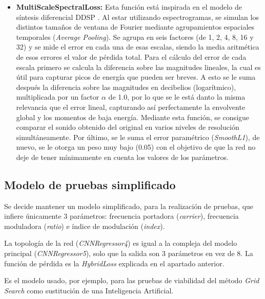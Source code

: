 \begin{itemize}
    \item \textbf{MultiScaleSpectralLoss: } Esta función está inspirada en el modelo de síntesis diferencial DDSP \citep{engel2020}. Al estar utilizando 
    espectrogramas, se simulan los distintos tamaños de ventana de Fourier mediante agrupamientos espaciales temporales (\textit{Average Pooling}).
    Se agrupa en seis factores (de 1, 2, 4, 8, 16 y 32) y se mide el error en cada una de esas escalas, siendo la media aritmética de esos errores
    el valor de pérdida total. Para el cálculo del error de cada escala primero se calcula la diferencia sobre las magnitudes
    lineales, la cual es útil para capturar picos de energía que pueden ser breves. A esto se le suma después la diferencia sobre las magnitudes en decibelios (logarítmico),
    multiplicada por un factor $\alpha$ de 1.0, por lo que se le está danto la misma relevancia que el error lineal, capturando así perfectamente
    la envolvente global y los momentos de baja energía. Mediante esta función, se consigue comparar el sonido obtenido del original
    en varios niveles de resolución simultáneamente. Por último, se le suma el error paramétrico (\textit{SmoothL1}), de nuevo, se le otorga un peso muy bajo (0.05) con el objetivo
    de que la red no deje de tener mínimamente en cuenta los valores de los parámetros.   
\end{itemize}


\subsection{Modelo de pruebas simplificado}
\label{sec:ModeloPruebasSimplificado}

Se decide mantener un modelo simplificado, para la realización de pruebas, que infiere únicamente 3 parámetros: frecuencia portadora (\textit{carrier}), frecuencia moduladora (\textit{ratio}) e índice de modulación (\textit{index}). 

La topología de la red (\textit{CNNRegressor4}) es igual a la compleja del modelo principal (\textit{CNNRegressor5}), solo que la salida son 3 parámetros en vez de 8. La función de pérdida es la \textit{HybridLoss} explicada en el apartado anterior. 

Es el modelo usado, por ejemplo, para las pruebas de viabilidad del método \textit{Grid Search} como sustitución de una Inteligencia Artificial.


